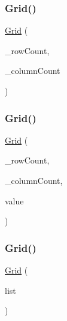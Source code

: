 \mbox{\label{classGrid_ab865eead452bcf3a84e25937153b7635}} 
\subsubsection{\texorpdfstring{Grid()}{Grid()}\hspace{0.1cm}{\footnotesize\ttfamily [2/4]}}
{\footnotesize\ttfamily \mbox{\hyperlink{classGrid}{Grid}} (\begin{DoxyParamCaption}\item[{int}]{\+\_\+row\+Count,  }\item[{int}]{\+\_\+column\+Count }\end{DoxyParamCaption})}

\mbox{\label{classGrid_a172bec01c9ecb4e2b43899fa317396a6}} 
\subsubsection{\texorpdfstring{Grid()}{Grid()}\hspace{0.1cm}{\footnotesize\ttfamily [3/4]}}
{\footnotesize\ttfamily \mbox{\hyperlink{classGrid}{Grid}} (\begin{DoxyParamCaption}\item[{int}]{\+\_\+row\+Count,  }\item[{int}]{\+\_\+column\+Count,  }\item[{const Value\+Type \&}]{value }\end{DoxyParamCaption})}

\mbox{\label{classGrid_a7700c2d2dc68587062f6696625802cd8}} 
\subsubsection{\texorpdfstring{Grid()}{Grid()}\hspace{0.1cm}{\footnotesize\ttfamily [4/4]}}
{\footnotesize\ttfamily \mbox{\hyperlink{classGrid}{Grid}} (\begin{DoxyParamCaption}\item[{std\+::initializer\+\_\+list$<$ std\+::initializer\+\_\+list$<$ Value\+Type $>$$>$}]{list }\end{DoxyParamCaption})}

